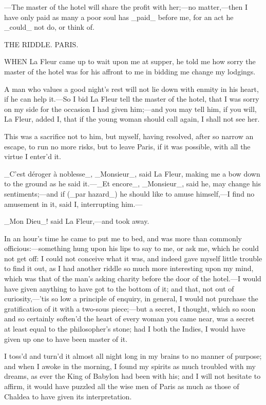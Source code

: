 \documentclass[twoside]{article}
\begin{document}
—The master of the hotel will share the profit with her;—no matter,—then
I have only paid as many a poor soul has _paid_ before me, for an act he
_could_ not do, or think of.




THE RIDDLE.
PARIS.


WHEN La Fleur came up to wait upon me at supper, he told me how sorry the
master of the hotel was for his affront to me in bidding me change my
lodgings.

A man who values a good night’s rest will not lie down with enmity in his
heart, if he can help it.—So I bid La Fleur tell the master of the hotel,
that I was sorry on my side for the occasion I had given him;—and you may
tell him, if you will, La Fleur, added I, that if the young woman should
call again, I shall not see her.

This was a sacrifice not to him, but myself, having resolved, after so
narrow an escape, to run no more risks, but to leave Paris, if it was
possible, with all the virtue I enter’d it.

_C’est déroger à noblesse_, _Monsieur_, said La Fleur, making me a bow
down to the ground as he said it.—_Et encore_, _Monsieur_, said he, may
change his sentiments;—and if (_par hazard_) he should like to amuse
himself,—I find no amusement in it, said I, interrupting him.—

_Mon Dieu_! said La Fleur,—and took away.

In an hour’s time he came to put me to bed, and was more than commonly
officious:—something hung upon his lips to say to me, or ask me, which he
could not get off: I could not conceive what it was, and indeed gave
myself little trouble to find it out, as I had another riddle so much
more interesting upon my mind, which was that of the man’s asking charity
before the door of the hotel.—I would have given anything to have got to
the bottom of it; and that, not out of curiosity,—’tis so low a principle
of enquiry, in general, I would not purchase the gratification of it with
a two-sous piece;—but a secret, I thought, which so soon and so certainly
soften’d the heart of every woman you came near, was a secret at least
equal to the philosopher’s stone; had I both the Indies, I would have
given up one to have been master of it.

I toss’d and turn’d it almost all night long in my brains to no manner of
purpose; and when I awoke in the morning, I found my spirits as much
troubled with my dreams, as ever the King of Babylon had been with his;
and I will not hesitate to affirm, it would have puzzled all the wise men
of Paris as much as those of Chaldea to have given its interpretation.
\end{document}
